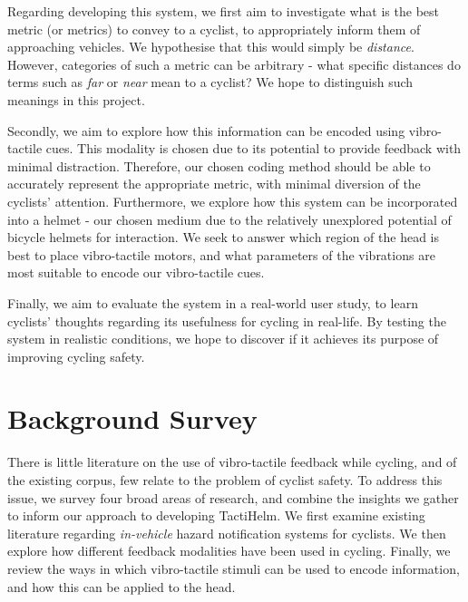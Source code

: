 \documentclass{interim}
\begin{document}
Regarding developing this system, we first aim to investigate what is the best metric (or metrics) to convey to a cyclist, to appropriately inform them of approaching vehicles. We hypothesise that this would simply be \textit{distance}. However, categories of such a metric can be arbitrary - what specific distances do terms such as \textit{far} or \textit{near} mean to a cyclist? We hope to distinguish such meanings in this project.

Secondly, we aim to explore how this information can be encoded using vibro-tactile cues. This modality is chosen due to its potential to provide feedback with minimal distraction. Therefore, our chosen coding method should be able to accurately represent the appropriate metric, with minimal diversion of the cyclists' attention. Furthermore, we explore how this system can be incorporated into a helmet - our chosen medium due to the relatively unexplored potential of bicycle helmets for interaction. We seek to answer which region of the head is best to place vibro-tactile motors, and what parameters of the vibrations are most suitable to encode our vibro-tactile cues.

Finally, we aim to evaluate the system in a real-world user study, to learn cyclists' thoughts regarding its usefulness for cycling in real-life. By testing the system in realistic conditions, we hope to discover if it achieves its purpose of improving cycling safety.


\section{Background Survey}
There is little literature on the use of vibro-tactile feedback while cycling, and of the existing corpus, few relate to the problem of cyclist safety. To address this issue, we survey four broad areas of research, and combine the insights we gather to inform our approach to developing TactiHelm. We first examine existing literature regarding \textit{in-vehicle} hazard notification systems for cyclists. We then explore how different feedback modalities have been used in cycling. Finally, we review the ways in which vibro-tactile stimuli can be used to encode information, and how this can be applied to the head.
\end{document}
